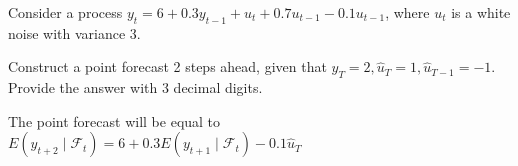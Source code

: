 
\begin{question}
Consider a process \(y_t = 6 + 0.3y_{t-1}+ u_t + 0.7 u_{t-1} - 0.1 u_{t-1}\), where \(u_t\) is a white noise with variance 3.

Construct a point forecast 2 steps ahead, given that \(y_T=2, \hat{u}_T=1, \hat{u}_{T-1}=-1\).\\
Provide the answer with 3 decimal digits.
\end{question}

\begin{solution}
The point forecast will be equal to \(E(y_{t+2}\mid \mathcal{F}_t) = 6+0.3E(y_{t+1}\mid \mathcal{F}_t)-0.1\hat{u}_T\)
\end{solution}

